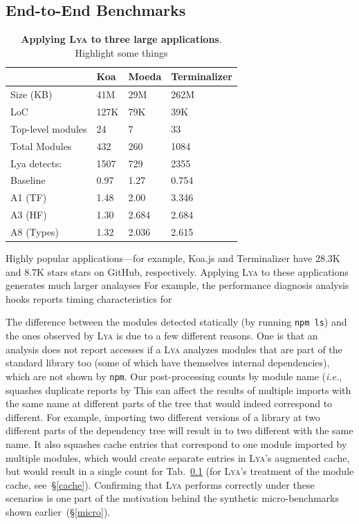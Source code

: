 \documentclass[letterpaper,twocolumn,10pt]{article}
\def\ie{{\em i.e.}, }
\newcommand{\ttt}[1]{\texttt{#1}}
\newcommand{\sx}[1]{(\S\ref{#1})}
\newcommand{\sys}{{\scshape Lya}\xspace}
\newcommand{\fixme}[1]{{\color{red}#1}}
\begin{document}
\subsection{End-to-End Benchmarks}
\label{macro}

\begin{table}[t]
\center
\footnotesize
\setlength\tabcolsep{3pt}
\caption{
  \footnotesize{
    \textbf{Applying \sys to three large applications}.
		\fixme{Highlight some things}
  }
}
\begin{tabular*}{\columnwidth}{l @{\extracolsep{\fill}} lll}
\toprule
                    & Koa    & Moeda   &  Terminalizer \\
\midrule
 Size (KB)          & 41M    &  29M    &   262M        \\
 LoC                & 127K   &  79K    &   39K         \\
 Top-level modules  &  24    &  7      &    33         \\
 Total Modules      &  432   &  260    &    1084       \\
 Lya detects:       &  1507  &   729   &     2355      \\
 Baseline           &  0.97  &  1.27   &    0.754      \\
 A1 (TF)            &  1.48  &  2.00   &    3.346      \\
 A3 (HF)            &  1.30  &  2.684  &    2.684      \\
 A8 (Types)         &  1.32  &  2.036  &    2.615      \\     
\bottomrule
\end{tabular*}
\label{tab:macro}
\vspace{-5mm}
\end{table}



Highly popular applications---for example, Koa.js and Terminalizer have 28.3K and 8.7K stars stars on GitHub, respectively.
Applying \sys to these applications generates much larger analayses
For example, the performance diagnosis analysis hooks reports timing characteristics for 

The difference between the modules detected statically (by running \ttt{npm ls}) and the ones observed by \sys is due to a few different reasons.
One is that an analysis does not report accesses if a 
\sys analyzes modules that are part of the standard library too (some of which have themselves internal dependencies), which are not shown by \ttt{npm}.
Our post-processing counts by module name (\ie squashes duplicate reports by 
This can affect the results of multiple imports with the same name at different parts of the tree that would indeed correspond to different.
For example, importing two different versions of a library at two different parts of the dependency tree will result in to two different with the same name.
It also squashes cache entries that correspond to one module imported by multiple modules, which would create separate entries in \sys's augmented cache, but would result in a single count for Tab.~\ref{macro} (for \sys's treatment of the module cache, see~\S\ref{cache}).
Confirming that \sys performs correctly under these scenarios is one part of the motivation behind the synthetic micro-benchmarks shown earlier~\sx{micro}.
\end{document}
